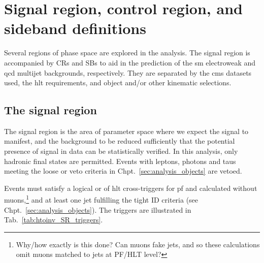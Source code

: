 \section{Signal region, control region, and sideband definitions}
\label{sec:region_definitions}

Several regions of phase space are explored in the analysis. The signal region is accompanied by \glspl{CR} and \glspl{SB} to aid in the prediction of the \acrshort{sm} electroweak and \acrshort{qcd} multijet backgrounds, respectively. They are separated by the \acrshort{cms} datasets used, the \acrlong{hlt} requirements, and object and/or other kinematic selections.





\subsection{The signal region}
\label{subsec:htoinv_signal_region}

The signal region is the area of parameter space where we expect the signal to manifest, and the background to be reduced sufficiently that the potential presence of signal in data can be statistically verified. In this analysis, only hadronic final states are permitted. Events with leptons, photons and taus meeting the loose or veto criteria in Chpt.~\ref{sec:analysis_objects} are vetoed.

Events must satisfy a logical or of \acrshort{hlt} cross-triggers for \acrlong{pf} \ptmiss and \mht calculated without muons,\footnote{Why/how exactly is this done? Can muons fake jets, and so these calculations omit muons matched to jets at PF/HLT level?} and at least one \gls{jet} fulfilling the tight ID criteria (see Chpt.~\ref{sec:analysis_objects}). The triggers are illustrated in Tab.~\ref{tab:htoinv_SR_triggers}.

